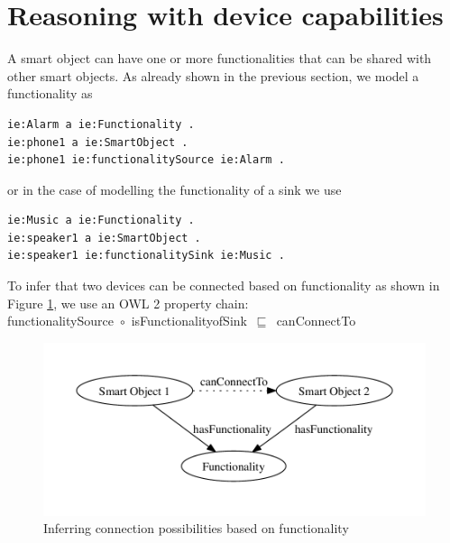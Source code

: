 \section{Reasoning with device capabilities}

A smart object can have one or more functionalities that can be shared with other smart objects. As already shown in the previous section, we model a functionality as 

\begin{verbatim}               
ie:Alarm a ie:Functionality .
ie:phone1 a ie:SmartObject .
ie:phone1 ie:functionalitySource ie:Alarm . 
\end{verbatim}

or in the case of modelling the functionality of a sink we use

\begin{verbatim}               
ie:Music a ie:Functionality .
ie:speaker1 a ie:SmartObject .
ie:speaker1 ie:functionalitySink ie:Music . 
\end{verbatim}

To infer that two devices can be connected based on functionality as shown in Figure \ref{canConnectTo}, we use an \ac{OWL} 2 property chain:\\

\noindent
functionalitySource~\ensuremath{\circ}~isFunctionalityofSink~\ensuremath{\sqsubseteq}~canConnectTo\\%

\begin{figure}[bth]
        \includegraphics[width=\linewidth]{canConnectTo}
        \caption{Inferring connection possibilities based on functionality}
        \label{canConnectTo}
\end{figure}

